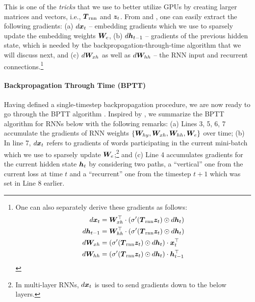 This is one of the {\it tricks} that we use to better utilize GPUs by creating
larger matrices and vectors, i.e., $\mbox{\boldmath{$T$}}_{\text{rnn}}$ and $\bm{z}_{t}$. From  and
, one can easily extract the following gradients:
(a) $d\bm{x}_{t}$ -- embedding gradients which we use to sparsely update the embedding weights $\bm{W}_{e}$, (b) $d\bm{h}_{t-1}$
 -- gradients of the previous hidden state, which is needed by the
 backpropagation-through-time algorithm that we will discuss next, and (c) $d\bm{W}_{xh}$ as well
as $d\bm{W}_{hh}$ -- the RNN input and recurrent connections.\footnote{One can also
separately derive these gradients as follows:
\begin{align*}
d\bm{x}_{t} &=  \bm{W}_{xh}^\top \cdot \left(\sigma'(\mbox{\boldmath{$T$}}_{\text{rnn}} \bm{z}_{t}) \odot d\bm{h}_{t}\right)\\
d\bm{h}_{t-1} &=  \bm{W}_{hh}^\top \cdot \left(\sigma'(\mbox{\boldmath{$T$}}_{\text{rnn}} \bm{z}_{t}) \odot d\bm{h}_{t}\right)\\
d\bm{W}_{xh} &=  \left(\sigma'(\mbox{\boldmath{$T$}}_{\text{rnn}} \bm{z}_{t}) \odot d\bm{h}_{t}\right) \cdot \bm{x}_{t}^\top \\
d\bm{W}_{hh} &=  \left(\sigma'(\mbox{\boldmath{$T$}}_{\text{rnn}} \bm{z}_{t}) \odot d\bm{h}_{t}\right) \cdot \bm{h}_{t-1}^\top
\end{align*}
}

\paragraph{Backpropagation Through Time (BPTT)}
Having defined a single-timestep backpropagation procedure, we are now ready to
go through the BPTT algorithm \cite{Rumelhart:1986:LPT,werbos1990}. Inspired by 
, we summarize the BPTT algorithm for RNNs below with the
following remarks: (a) Lines 3, 5, 6, 7 accumulate the gradients of RNN weights
$\{\bm{W}_{hy}, \bm{W}_{xh}, \bm{W}_{hh}, \bm{W}_{e}\}$ over time; (b) In line 7, $d\bm{x}_{t}$ refers to
gradients of words participating in the current mini-batch which we use to
sparsely update $\bm{W}_{e}$;\footnote{In multi-layer
RNNs, $d\bm{x}_{t}$ is used to send gradients down to the below layers.} and (c) Line
4 accumulates gradients for the current hidden state $\bm{h}_{t}$ by considering two paths,
a ``vertical'' one from  the current loss at time $t$ and a ``recurrent'' one from the timestep
$t+1$ which was set in Line 8 earlier.

